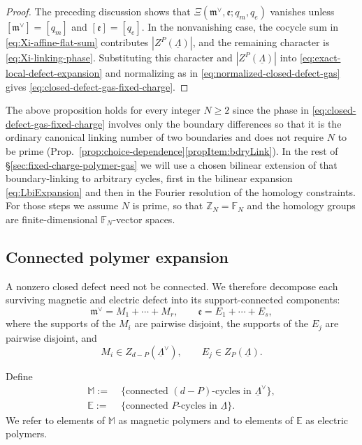 \begin{proof}
	The preceding discussion shows that
	\(\Xi(\mathfrak m^\vee,\mathfrak e;q_m,q_e)\) vanishes unless $[\mathfrak m^\vee]=[q_m]$ and $[\mathfrak e]=[q_e]$.
	In the nonvanishing case, the cocycle sum in
	\eqref{eq:Xi-affine-flat-sum} contributes
	\(|Z^P(\underline\Lambda)|\), and the remaining character is \eqref{eq:Xi-linking-phase}. Substituting this character and $|Z^P(\underline\Lambda)|$ into \eqref{eq:exact-local-defect-expansion} and normalizing as in
	\eqref{eq:normalized-closed-defect-gas} gives \eqref{eq:closed-defect-gas-fixed-charge}.
\end{proof}
The above proposition holds for every integer \(N\ge 2\) since the phase in
\eqref{eq:closed-defect-gas-fixed-charge} involves only the boundary
differences so that it is the ordinary canonical linking number of two boundaries and does not require \(N\) to be prime (Prop.~\ref{prop:choice-dependence}\ref{propItem:bdryLink}). In the rest of \S\ref{sec:fixed-charge-polymer-gas} we will use a chosen bilinear extension of
that boundary-linking to arbitrary cycles, first in the bilinear expansion
\eqref{eq:LbiExpansion} and then in the Fourier resolution of the homology
constraints. For those steps we assume \(N\) is prime, so that
\(\mathbb Z_N=\mathbb F_N\) and the homology groups are finite-dimensional
\(\mathbb F_N\)-vector spaces.





\subsection{Connected polymer expansion}
\label{sec:fixed-charge-connected-polymers}

A nonzero closed defect need not be connected. We therefore decompose each surviving
magnetic and electric defect into its support-connected components:
\begin{equation}
	\mathfrak m^\vee=M_1+\cdots+M_r,
	\qquad
	\mathfrak e=E_1+\cdots+E_s,
	\label{eq:connected-defect-decomposition}
\end{equation}
where the supports of the \(M_i\) are pairwise disjoint, the supports of the \(E_j\) are
pairwise disjoint, and
\begin{equation}
	M_i\in Z_{d-P}(\underline\Lambda^\vee),
	\qquad
	E_j\in Z_P(\underline\Lambda).
\end{equation}

Define
\begin{equation}
\begin{aligned}
	\mathbb M 
	:=&\;
	\{\text{connected }(d-P)\text{-cycles in }\underline\Lambda^\vee\},
	\\
	\mathbb E 
	:=&\;
	\{\text{connected }P\text{-cycles in }\underline\Lambda\}.
\end{aligned}
	\label{eq:polymer-sets-fixed-charge}
\end{equation}
We refer to elements of \(\mathbb M \) as magnetic polymers and to elements of
\(\mathbb E \) as electric polymers.

